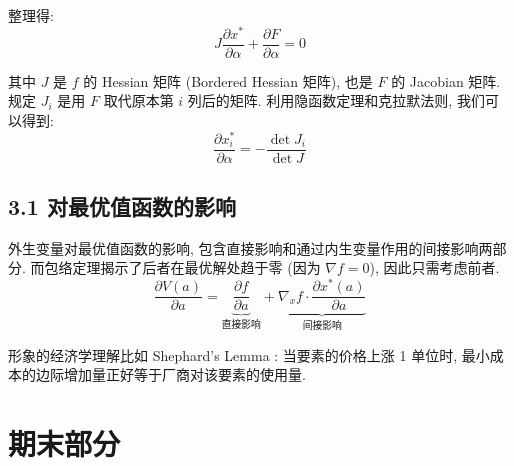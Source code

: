 整理得:
$$J \frac{\partial x^*}{\partial \alpha} + \frac{\partial F}{\partial \alpha} =0$$

其中 $J$ 是 $f$ 的 Hessian 矩阵 (Bordered Hessian 矩阵), 也是 $F$ 的 Jacobian 矩阵. 规定 $J_i$ 是用 $F$ 取代原本第 $i$ 列后的矩阵. 利用隐函数定理和克拉默法则, 我们可以得到:
$$ \frac{\partial x^*_i}{\partial \alpha} = -\frac{\det J_{i}}{\det J} $$

\subsection*{3.1 对最优值函数的影响}
外生变量对最优值函数的影响, 包含直接影响和通过内生变量作用的间接影响两部分. 而包络定理揭示了后者在最优解处趋于零 (因为 $\nabla f = 0$), 因此只需考虑前者. 
$$\frac{\partial V(a)}{\partial a} = \underbrace{\frac{\partial f}{\partial a}}_{\text{直接影响}} + \underbrace{\nabla_x f \cdot \frac{\partial x^*(a)}{\partial a}}_{\text{间接影响}} $$

形象的经济学理解比如 Shephard's Lemma : 当要素的价格上涨 1 单位时, 最小成本的边际增加量正好等于厂商对该要素的使用量.
\section*{期末部分}



%







